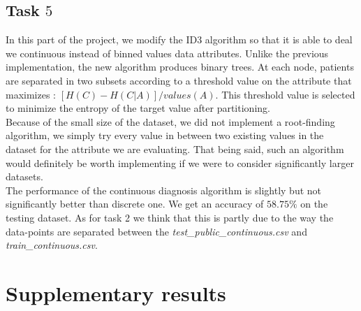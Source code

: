 \documentclass[9pt]{extarticle}
\begin{document}
\subsection{Task $5$}
In this part of the project, we modify the ID3 algorithm so that it is able to deal we continuous instead of binned values data attributes. Unlike the previous implementation, the new algorithm produces binary trees. At each node, patients are separated in two subsets according to a threshold value on the attribute that maximizes : $[H(C) - H(C|A)] / {values(A)}$. This threshold value is selected to minimize the entropy of the target value after partitioning. \\
Because of the small size of the dataset, we did not implement a root-finding algorithm, we simply try every value in between two existing values in the dataset for the attribute we are evaluating. That being said, such an algorithm would definitely be worth implementing if we were to consider significantly larger datasets. \\
The performance of the continuous diagnosis algorithm is slightly but not significantly better than discrete one. We get an accuracy of $58.75\%$ on the testing dataset. As for task 2 we think that this is partly due to the way the data-points are separated between the \emph{test\_public\_continuous.csv} and \emph{train\_continuous.csv}. 
\newpage 

\section{Supplementary results}
\end{document}
